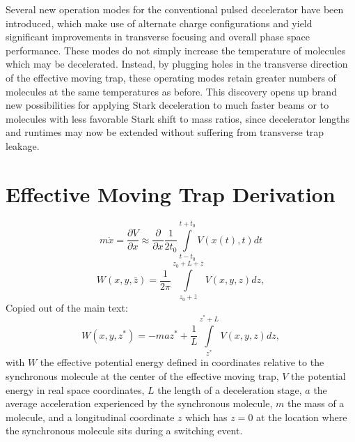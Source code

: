 \documentclass[%
 reprint,
 amsmath,amssymb,
 aps,
prl,
]{revtex4-1}
\begin{document}
Several new operation modes for the conventional pulsed decelerator have been introduced, which make use of alternate charge configurations and yield significant improvements in transverse focusing and overall phase space performance.
These modes do not simply increase the temperature of molecules which may be decelerated.
Instead, by plugging holes in the transverse direction of the effective moving trap, these operating modes retain greater numbers of molecules at the same temperatures as before.
This discovery opens up brand new possibilities for applying Stark deceleration to much faster beams or to molecules with less favorable Stark shift to mass ratios, since decelerator lengths and runtimes may now be extended without suffering from transverse trap leakage.








\appendix

\section{Effective Moving Trap Derivation\label{app:effpot}}
\begin{equation}
m\ddot{x}=\frac{\partial V}{\partial x}\approx \frac{\partial}{\partial x}\frac{1}{2t_0}\int\limits_{t-t_0}^{t+t_0}V(x(t),t)dt
\end{equation}
\begin{equation}
W(x,y,\bar{z}) = \frac{1}{2\pi}\int\limits_{z_0+\bar{z}}^{z_0+L+\bar{z}}V(x,y,z)dz, 
\end{equation}
Copied out of the main text:
\begin{equation}
W(x,y,z^*) = - maz^* + \frac{1}{L}\int\limits_{z^*}^{z^*+L}V(x,y,z) dz,
\end{equation}
with $W$ the effective potential energy defined in coordinates relative to the synchronous molecule at the center of the effective moving trap, $V$ the potential energy in real space coordinates, $L$ the length of a deceleration stage, $a$ the average acceleration experienced by the synchronous molecule, $m$ the mass of a molecule, and a longitudinal coordinate $z$ which has $z=0$ at the location where the synchronous molecule sits during a switching event.
\end{document}
